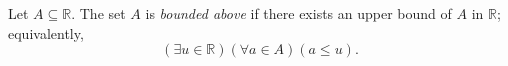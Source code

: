 \begin{definition}
\label{def:bounded-above}
Let $A\subseteq\mathbb{R}$. The set $A$ is \emph{bounded above} if there
exists an upper bound of $A$ in $\mathbb{R}$; equivalently,
\[
  (\exists u\in\mathbb{R})(\forall a\in A)(a\leq u).
\]
\end{definition}